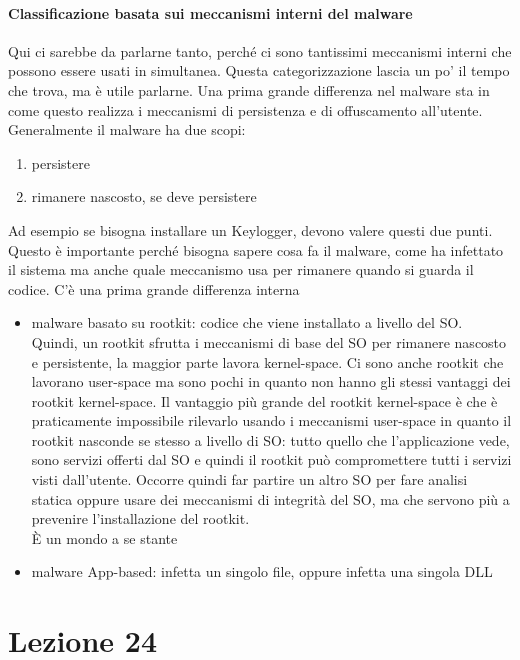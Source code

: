 \documentclass[12pt, oneside]{extbook}
\begin{document}
\subsubsection{Classificazione basata sui meccanismi interni del malware}
Qui ci sarebbe da parlarne tanto, perché ci sono tantissimi meccanismi interni che possono essere usati in simultanea. Questa categorizzazione lascia un po' il tempo che trova, ma è utile parlarne. Una prima grande differenza nel malware sta in come questo realizza i meccanismi di persistenza e di offuscamento all'utente. Generalmente il malware ha due scopi:
\begin{enumerate}
\item persistere
\item rimanere nascosto, se deve persistere
\end{enumerate}
Ad esempio se bisogna installare un Keylogger, devono valere questi due punti. Questo è importante perché bisogna sapere cosa fa il malware, come ha infettato il sistema ma anche quale meccanismo usa per rimanere quando si guarda il codice. C'è una prima grande differenza interna
\begin{itemize}
\item malware basato su rootkit: codice che viene installato a livello del SO. Quindi, un rootkit sfrutta i meccanismi di base del SO per rimanere nascosto e persistente, la maggior parte lavora kernel-space. Ci sono anche rootkit che lavorano user-space ma sono pochi in quanto non hanno gli stessi vantaggi dei rootkit kernel-space. Il vantaggio più grande del rootkit kernel-space è che è praticamente impossibile rilevarlo usando i meccanismi user-space in quanto il rootkit nasconde se stesso a livello di SO: tutto quello che l'applicazione vede, sono servizi offerti dal SO e quindi il rootkit può compromettere tutti i servizi visti dall'utente. Occorre quindi far partire un altro SO per fare analisi statica oppure usare dei meccanismi di integrità del SO, ma che servono più a prevenire l'installazione del rootkit.\\È un mondo a se stante
\item malware App-based: infetta un singolo file, oppure infetta una singola DLL
\end{itemize}
\chapter{Lezione 24}
\end{document}
